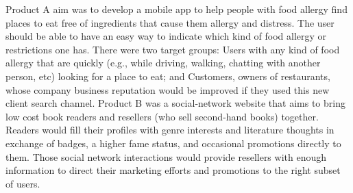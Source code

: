 Product A aim was to develop a mobile app to help people with food allergy find places to eat free of ingredients that cause them allergy and distress. The user should be able to have an easy way to indicate which kind of food allergy or restrictions one has. There were two target groups: Users with any kind of food allergy that are quickly (e.g., while driving, walking, chatting with another person, etc) looking for a place to eat; and Customers, owners of restaurants, whose company business reputation would be improved if they used this new client search channel. Product B was a social-network website that aims to bring low cost book readers and resellers (who sell second-hand books) together. Readers would fill their profiles with genre interests and literature thoughts in exchange of badges, a higher fame status, and occasional promotions directly to them. Those social network interactions would provide resellers with enough information to direct their marketing efforts and promotions to the right subset of users.%